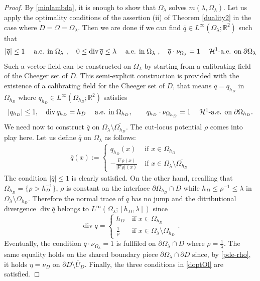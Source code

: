 \documentclass[reqno,11pt]{amsart}
\theoremstyle{definition}
\numberwithin{equation}{section}
\def\ov{\overline}
\DeclareMathOperator{\Div}{div}
\newcommand{\HH}{\mathcal{H}}
\newcommand{\RR}{\mathbb{R}}
\def\R{\mathbb{R}}
\newcommand{\tinm}[1]{\text{\;#1\;}}
\newcommand{\1}{{{\bf 1}\kern-0,28em\rm l}}
\def\O{\Omega}
\def\l{\lambda}
\begin{document}
\begin{proof} By \eqref{minlambda}, it is enough to show that $\O_\l$ solves $m(\l, \O_\l)$. Let us apply  the optimality conditions of the assertion (ii) of Theorem \ref{duality2} in the case where  $D=\O= \O_\l$. Then we are done if we can find $\ov q\in L^\infty(\O_\l;\R^2)$ such that
\begin{align}
 |\ov q| \le 1 \quad\tinm{a.e. in} \O_\l\ ,\quad 0 \le \Div \ov q \le \lambda \quad\tinm{a.e. in} \O_\l \ ,\quad
 \ov q\cdot \nu_{\O_\l} =1 \quad\tinm{$\HH^1$-a.e. on} \partial \O_\l\label{doptOl}
\end{align}
Such a vector field can be  constructed on $\O_\l$ by starting from a calibrating field of the Cheeger set of $D$. This semi-explicit construction is provided with the existence of a calibrating field for the Cheeger set of $D$, that means $\ov q= q_{h_D}$ in $\Omega_{h_D}$ where $q_{h_D}\in L^\infty(\Omega_{h_D};\RR^2)$ satisfies
\begin{align*}
|q_{h_D}| \le 1,\quad \Div q_{h_D} = h_D \quad\tinm{a.e. in} \Omega_{h_D},\qquad q_{h_D} \cdot \nu_{\Omega_{h_D}} =1 \quad\tinm{$\HH^1$-a.e. on} \partial \Omega_{h_D}.
\end{align*}
We need  now  to construct $\ov q$ on $\O_\l\setminus \ov{\O_{h_D}}$.  The cut-locus potential $\rho$ comes into play here.
Let us define $\ov q$ on $\O_\l$ as follows: 
\begin{align}\label{calib-Olambda}
\ov q (x) := \begin{cases}  q_{h_D}(x) & \ \text{if $x\in \O_{h_D}$} \\
- \frac{\nabla \rho(x)}{|\nabla \rho|(x)} & \ \text{if $x\in \O_\l\setminus \ov{\O_{h_D}} $} \end{cases}
\end{align}
The condition $ |\ov q| \le 1$ is clearly satisfied. On the other hand, recalling that $\O_{h_D}=\{\rho>h_D^{-1}\}$,  $\rho$ is constant  on the interface $\partial \O_{h_D} \cap D$ while $h_D\le \rho^{-1}\le \l$ in $\O_\l\setminus \O_{h_D}$.  Therefore the normal trace of $\ov q$ has no jump and  the ditributional divergence  $\Div \ov q $ belongs to $L^\infty(\O_\l;  [h_D, \l])$ since
$$  \Div \ov q = \begin{cases} h_D & \ \text{if $x\in \O_{h_D}$} \\
\frac1{\rho} &\ \text{if $x\in \O_\l\setminus \O_{h_D}$} \end{cases}.$$
Eventually, the condition $\ov q\cdot \nu_{\O_\l} =1$ is fullfiled on $\partial\O_\l \cap D$ where $\rho =\frac1{\l}$. 
The same equality holds on the shared boundary piece $\partial\O_\l \cap \partial D$ since, by \eqref{pde-rho}, it holds  $\eta=\nu_D$ on $\partial D \setminus \ov U_D$. 
Finally, the three  conditions in \eqref{doptOl} are satisfied.
\end{proof}  
\end{document}
